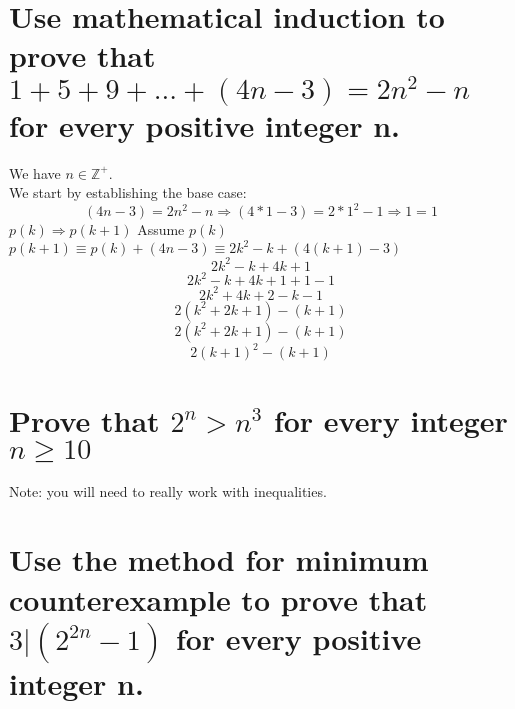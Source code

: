 \section{Use mathematical induction to prove that $1+5+9+...+(4n-3)=2n^2-n$ for every positive integer n.}
We have $n\in \mathbb{Z}^{+}$.\\
We start by establishing the base case:
\begin{equation}
(4n-3) = 2n^2-n \Rightarrow (4*1-3) = 2*1^2-1 \Rightarrow 1 = 1
\end{equation}
$p(k)\Rightarrow p(k+1)$
Assume $p(k)$\\
$p(k+1) \equiv p(k)+(4n-3) \equiv 2k^2-k+(4(k+1)-3)$\\
\begin{equation}
2k^2-k+4k+1
\end{equation}
\begin{equation}
2k^2-k+4k+1+1-1
\end{equation}
\begin{equation}
2k^2+4k+2-k-1
\end{equation}
\begin{equation}
2(k^2+2k+1)-(k+1)
\end{equation}
\begin{equation}
2(k^2+2k+1)-(k+1)
\end{equation}
\begin{equation}
2(k+1)^2-(k+1)
\end{equation}

\section{Prove that $2^n>n^3$ for every integer $n\geq 10$}
Note: you will need to really work with inequalities.


\section{Use the method for minimum counterexample to prove that $3|(2^{2n}-1)$ for every positive integer n.}


